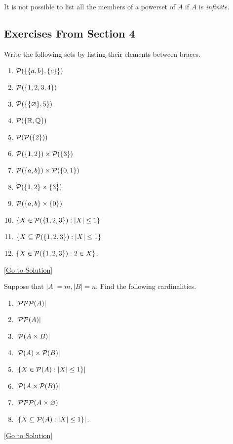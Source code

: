 It is not possible to list all the members of a powerset of $A$ if $A$ is \emph{infinite.}

\subsection{Exercises From Section 4}
\begin{exercise}\label{ex:4.1}
    Write the following sets by listing their elements between braces. 
    \begin{enumerate}
        \item $\mathcal{P}(\{ \{ a,b \},\{ c \} \})$
        \item $\mathcal{P}(\{ 1,2,3,4 \})$
        \item $\mathcal{P}(\{ \{ \varnothing \},5 \})$
        \item $\mathcal{P}(\{ \mathbb{R},\mathbb{Q} \})$
        \item $\mathcal{P}(\mathcal{P}(\{ 2 \}))$
        \item $\mathcal{P}(\{ 1,2 \})\times\mathcal{P}(\{ 3 \})$
        \item $\mathcal{P}(\{ a,b \})\times\mathcal{P}(\{ 0,1 \})$
        \item $\mathcal{P}(\{ 1,2 \}\times \{ 3 \})$
        \item $\mathcal{P}(\{ a,b \}\times \{ 0 \})$
        \item $\{ X\in\mathcal{P}(\{ 1,2,3 \}):\lvert X \rvert\le 1 \}$
        \item $\{ X\subseteq\mathcal{P}(\{ 1,2,3 \}):\lvert X \rvert\le 1 \}$
        \item $\{ X\in\mathcal{P}(\{ 1,2,3 \}):2\in X \}$.
    \end{enumerate}
\end{exercise}\hyperref[sol:4.1]{[Go to Solution]}

\begin{exercise}\label{ex:4.2}
    Suppose that $\lvert A \rvert=m,\lvert B \rvert=n$. Find the following cardinalities. 
    \begin{enumerate}
        \item $\lvert \mathcal{P}\mathcal{P}\mathcal{P}(A) \rvert$
        \item $\lvert \mathcal{P}\mathcal{P}(A) \rvert$
        \item $\lvert \mathcal{P}(A\times B) \rvert$
        \item $\lvert \mathcal{P}(A)\times\mathcal{P}(B) \rvert$
        \item $\lvert \{ X\in\mathcal{P}(A):\lvert X \rvert\le 1 \} \rvert$
        \item $\lvert \mathcal{P}(A\times\mathcal{P}(B)) \rvert$
        \item $\lvert \mathcal{P}\mathcal{P}\mathcal{P}(A\times\varnothing) \rvert$
        \item $\lvert \{ X\subseteq\mathcal{P}(A):\lvert X \rvert\le 1 \} \rvert$.
    \end{enumerate}
\end{exercise}\hyperref[sol:4.2]{[Go to Solution]}

